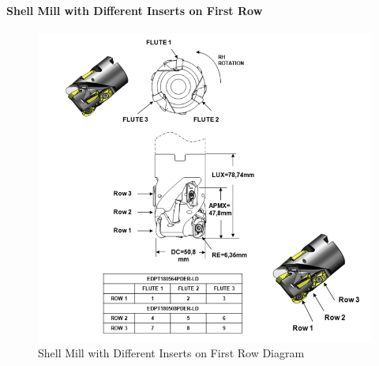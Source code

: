 \pagebreak

\paragraph{Shell Mill with Different Inserts on First Row}
\label{sec:Shell Mill with Different Inserts on First Row}

\begin{figure}[ht]
  \centering
    \includegraphics[width=1.0\textwidth]{figures/Shell Mill with Different Inserts on First Row.png}
  \caption{Shell Mill with Different Inserts on First Row Diagram}
  \label{fig:Shell Mill with Different Inserts on First Row Diagram}
\end{figure}

\FloatBarrier


